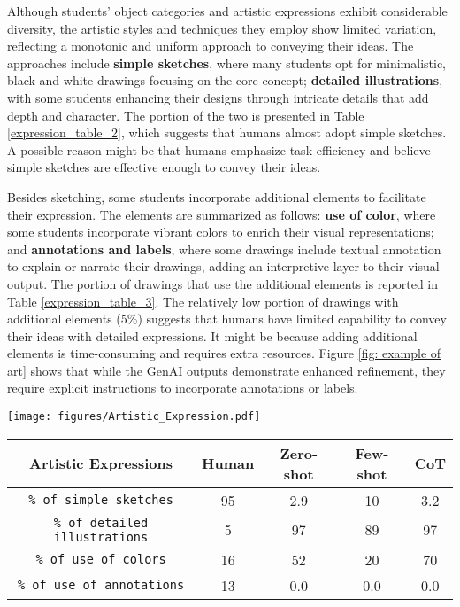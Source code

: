 Although students' object categories and artistic expressions exhibit considerable diversity, the artistic styles and techniques they employ show limited variation, reflecting a monotonic and uniform approach to conveying their ideas. The approaches include \textbf{simple sketches}, where many students opt for minimalistic, black-and-white drawings focusing on the core concept; \textbf{detailed illustrations}, with some students enhancing their designs through intricate details that add depth and character. The portion of the two is presented in Table \ref{expression_table_2}, which suggests that humans almost adopt simple sketches. A possible reason might be that humans emphasize task efficiency and believe simple sketches are effective enough to convey their ideas.

Besides sketching, some students incorporate additional elements to facilitate their expression. The elements are summarized as follows: \textbf{use of color}, where some students incorporate vibrant colors to enrich their visual representations; and \textbf{annotations and labels}, where some drawings include textual annotation to explain or narrate their drawings, adding an interpretive layer to their visual output. 
The portion of drawings that use the additional elements is reported in Table \ref{expression_table_3}. 
The relatively low portion of drawings with additional elements (5\%) suggests that humans have limited capability to convey their ideas with detailed expressions. It might be because adding additional elements is time-consuming and requires extra resources. 
Figure \ref{fig: example of art} shows that while the GenAI outputs demonstrate enhanced refinement, they require explicit instructions to incorporate annotations or labels.


\begin{figure*}
    \texttt{[image: figures/Artistic\_Expression.pdf]} %
    \label{fig: example of art}
\end{figure*}

\begin{table*}
  \caption{The portion of the frequent artistic expression of humans and GenAI.}
  \label{expression_table_3}
  \begin{tabular}{ccccc}
    \toprule
    Artistic Expressions                     & Human          & Zero-shot & Few-shot & CoT\\
    \midrule
    \texttt{\% of simple sketches}           & 95             & 2.9        & 10      & 3.2\\
    \texttt{\% of detailed illustrations}    & 5              & 97       & 89      & 97\\ \hline
    \texttt{\% of use of colors}             & 16             & 52        & 20      & 70\\
    \texttt{\% of use of annotations}        & 13             & 0.0        & 0.0     & 0.0\\
    \bottomrule
  \end{tabular}
\end{table*}

